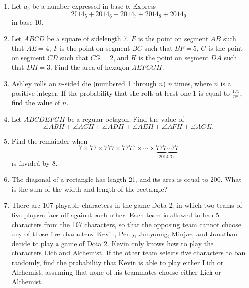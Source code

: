 \documentclass[11pt]{article}
\theoremstyle{definition}
\newcommand{\fdbox}[2]{\fbox{\sffamily\LARGE\vphantom y#1: \bfseries #2} \par\vspace{1em}} %
\begin{document}
\newcommand{\logo}{%
\begin{minipage}[b]{22em}
\centering\noindent
\\[0.5em]
\begin{minipage}[t][4em][t]{12em} \centering
{\huge \bfseries ${\bf 26^{\text{th}}}$ TJIMO } \\
\textsc{\large Alexandria, Virginia}
\end{minipage}
\end{minipage}
\vspace*{-0.05em}
}
\newcommand{\sevenpoints}{Time limit: 30 minutes.}
\newcommand{\righthead}{\fdbox{Round}{Team}}



\begin{enumerate}


\item Let $a_b$ be a number expressed in base $b$. Express\[2014_{5}+2014_{6}+2014_{7}+2014_{8}+2014_{9}\]in base 10.

\item Let $ABCD$ be a square of sidelength 7. $E$ is the point on segment $AB$ such that $AE = 4$, $F$ is the point on segment $BC$ such that $BF = 5$, $G$ is the point on segment $CD$ such that $CG = 2$, and $H$ is the point on segment $DA$ such that $DH = 3$. Find the area of hexagon $AEFCGH$.

\item Ashley rolls an $n$-sided die (numbered 1 through $n$) $n$ times, where $n$ is a positive integer. If the probability that she rolls at least one 1 is equal to $\frac{175}{n^n}$, find the value of $n$.

\item Let $ABCDEFGH$ be a regular octagon. Find the value of\[\angle ABH + \angle ACH + \angle ADH + \angle AEH + \angle AFH + \angle AGH.\]

\item Find the remainder when \[7 \times 77 \times 777 \times 7777 \times \cdots \times \underbrace{777\cdots 77}_{\text{2014 7's}}\]is divided by 8.

\item The diagonal of a rectangle has length 21, and its area is equal to 200. What is the sum of the width and length of the rectangle? 

\item There are 107 playable characters in the game Dota 2, in which two teams of five players face off against each other. Each team is allowed to ban 5 characters from the 107 characters, so that the opposing team cannot choose any of those five characters. Kevin, Perry, Junyoung, Minjae, and Jonathan decide to play a game of Dota 2. Kevin only knows how to play the characters Lich and Alchemist. If the other team selects five characters to ban randomly, find the probability that Kevin is able to play either Lich or Alchemist, assuming that none of his teammates choose either Lich or Alchemist. 


\end{enumerate}
\end{document}
